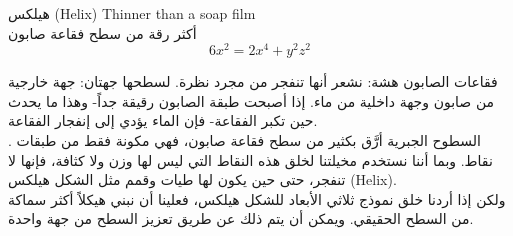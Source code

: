 \begin{surferPage}{هيلكس (Helix)}
Thinner than a soap film\\
أكثر رقة من سطح فقاعة صابون\\
  \smallskip
\[6x^2	= 2x^4	+ y^2	z^2\]

\singlespacing
فقاعات الصابون هشة: نشعر أنها تنفجر من مجرد نظرة. لسطحها جهتان: جهة خارجية من صابون وجهة داخلية من ماء. إذا أصبحت طبقة الصابون رقيقة جداً- وهذا ما يحدث حين تكبر الفقاعة- فإن الماء يؤدي إلى إنفجار الفقاعة.\\
\vspace{0,3cm}. 
السطوح الجبرية أرَّق بكثير من سطح فقاعة صابون، فهي مكونة فقط من طبقات نقاط. وبما أننا نستخدم مخيلتنا لخلق هذه النقاط التي ليس لها وزن ولا كثافة، فإنها لا تنفجر، حتى حين يكون لها طيات وقمم مثل الشكل هيلكس (Helix).\\ 
\vspace{0,3cm}
ولكن إذا أردنا خلق نموذج ثلاثي الأبعاد للشكل هيلكس، فعلينا أن نبني هيكلاً أكثر سماكة من السطح الحقيقي. ويمكن أن يتم ذلك عن طريق تعزيز السطح من جهة واحدة.
\end{surferPage}
